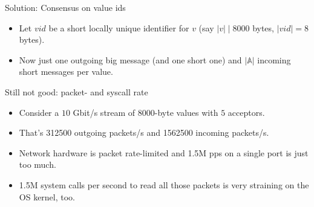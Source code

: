 \documentclass{beamer}
\begin{document}
\begin{frame}{Solution: Consensus on value ids}
  \begin{figure}
  \centering
  \end{figure}
  \begin{itemize}
    \item Let $vid$ be a short locally unique identifier for $v$ (say $|v| \mid 8000$ bytes, $|vid| = 8$ bytes).
    \item Now just one outgoing big message (and one short one) and $|\mathbb{A}|$ incoming short messages per value.
  \end{itemize}
\end{frame}

\begin{frame}{Still not good: packet- and syscall rate}
  \begin{itemize}
    \item Consider a $10$ Gbit/s stream of $8000$-byte values with $5$ acceptors.
    \item That's 312500 outgoing packets/s and \alert{1562500} incoming packets/s.
    \item Network hardware is packet rate-limited and 1.5M pps on a single port is just too much.
    \item 1.5M system calls per second to read all those packets is very straining on the OS kernel, too.
  \end{itemize}
\end{frame}
\end{document}
